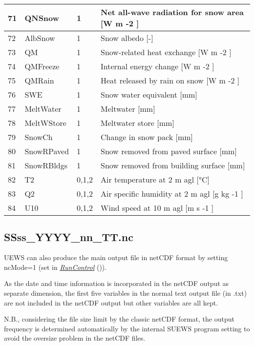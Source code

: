 \documentclass[letterpaper,10pt,english]{sphinxmanual}
\begin{document}
\begin{savenotes}
\begin{longtable}{|l|l|l|l|}
\\
\hline
71
&
QNSnow
&
1
&
Net all-wave radiation for snow area {[}W m -2 {]}
\\
\hline
72
&
AlbSnow
&
1
&
Snow albedo {[}-{]}
\\
\hline
73
&
QM
&
1
&
Snow-related heat exchange {[}W m -2 {]}
\\
\hline
74
&
QMFreeze
&
1
&
Internal energy change {[}W m -2 {]}
\\
\hline
75
&
QMRain
&
1
&
Heat released by rain on snow {[}W m -2 {]}
\\
\hline
76
&
SWE
&
1
&
Snow water equivalent {[}mm{]}
\\
\hline
77
&
MeltWater
&
1
&
Meltwater {[}mm{]}
\\
\hline
78
&
MeltWStore
&
1
&
Meltwater store {[}mm{]}
\\
\hline
79
&
SnowCh
&
1
&
Change in snow pack {[}mm{]}
\\
\hline
80
&
SnowRPaved
&
1
&
Snow removed from paved surface {[}mm{]}
\\
\hline
81
&
SnowRBldgs
&
1
&
Snow removed from building surface {[}mm{]}
\\
\hline
82
&
T2
&
0,1,2
&
Air temperature at 2 m agl {[}°C{]}
\\
\hline
83
&
Q2
&
0,1,2
&
Air specific humidity at 2 m agl {[}g kg -1 {]}
\\
\hline
84
&
U10
&
0,1,2
&
Wind speed at 10 m agl {[}m s -1 {]}
\\
\hline
\end{longtable}\sphinxatlongtableend\end{savenotes}


\subsection{SSss\_YYYY\_nn\_TT.nc}
\label{\detokenize{output_files/output_files:ssss-yyyy-nn-tt-nc}}
UEWS can also produce the main output file in netCDF format by setting ncMode=1 (set in {\hyperref[\detokenize{output_files/output_files:RunControl}]{\emph{RunControl}}} ()).

As the date and time information is incorporated in the netCDF output as
separate dimension, the first five variables in the normal text output
file (in .txt) are not included in the netCDF output but other variables
are all kept.

N.B., considering the file size limit by the classic netCDF format, the
output frequency is determined automatically by the internal SUEWS
program setting to avoid the oversize problem in the netCDF files.
\end{document}
